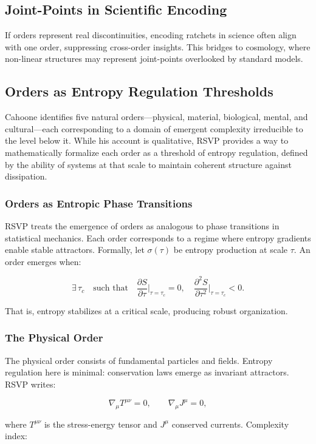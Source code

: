\documentclass[12pt]{book}
\begin{document}
\subsection{Joint-Points in Scientific Encoding}
If orders represent real discontinuities, encoding ratchets in science often align with one order, suppressing cross-order insights. This bridges to cosmology, where non-linear structures may represent joint-points overlooked by standard models.

\subsection{Orders as Entropy Regulation Thresholds}
Cahoone identifies five natural orders—physical, material, biological, mental, and cultural—each corresponding to a domain of emergent complexity irreducible to the level below it. While his account is qualitative, RSVP provides a way to mathematically formalize each order as a threshold of entropy regulation, defined by the ability of systems at that scale to maintain coherent structure against dissipation.

\subsubsection{Orders as Entropic Phase Transitions}
RSVP treats the emergence of orders as analogous to phase transitions in statistical mechanics. Each order corresponds to a regime where entropy gradients enable stable attractors. Formally, let \( \sigma(\tau) \) be entropy production at scale \( \tau \). An order emerges when:

\[ \exists \, \tau_c \quad \text{such that} \quad \frac{\partial S}{\partial \tau}\Big|_{\tau=\tau_c} = 0, \quad \frac{\partial^2 S}{\partial \tau^2}\Big|_{\tau=\tau_c} < 0. \]

That is, entropy stabilizes at a critical scale, producing robust organization.

\subsubsection{The Physical Order}
The physical order consists of fundamental particles and fields. Entropy regulation here is minimal: conservation laws emerge as invariant attractors. RSVP writes:

\[ \nabla_\mu T^{\mu\nu} = 0, \qquad \nabla_\mu J^\mu = 0, \]

where \( T^{\mu\nu} \) is the stress-energy tensor and \( J^\mu \) conserved currents. Complexity index:
\end{document}
